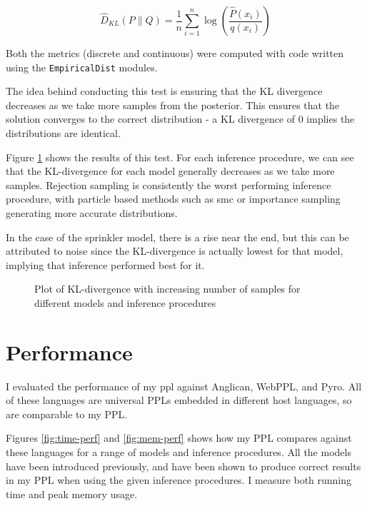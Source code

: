 \begin{equation}
	\label{eq:final_kl_est}
	\hat{D}_{KL}(P \| Q) = \frac1{n}\sum_{i=1}^n \log\left(\frac{\hat{P}(x_i)}{q(x_i)}\right) 
\end{equation}

Both the metrics (discrete and continuous) were computed with code written using the \texttt{EmpiricalDist} modules.

The idea behind conducting this test is ensuring that the KL divergence decreases as we take more samples from the posterior. This ensures that the solution converges to the correct distribution - a KL divergence of 0 implies the distributions are identical.

Figure \ref{fig:kl} shows the results of this test. For each inference procedure, we can see that the KL-divergence for each model generally decreases as we take more samples. Rejection sampling is consistently the worst performing inference procedure, with particle based methods such as smc or importance sampling generating more accurate distributions.

In the case of the sprinkler model, there is a rise near the end, but this can be attributed to noise since the KL-divergence is actually lowest for that model, implying that inference performed best for it. 

\begin{figure}[!ht]
	\centering
	
	\caption{Plot of KL-divergence with increasing number of samples for different models and inference procedures}
	\label{fig:kl}
\end{figure}


\section{Performance}

I evaluated the performance of my ppl against Anglican, WebPPL, and Pyro. All of these languages are universal PPLs embedded in different host languages, so are comparable to my PPL.

Figures \ref{fig:time-perf} and \ref{fig:mem-perf} shows how my PPL compares against these languages for a range of models and inference procedures. All the models have been introduced previously, and have been shown to produce correct results in my PPL when using the given inference procedures. I measure both running time and peak memory usage.

